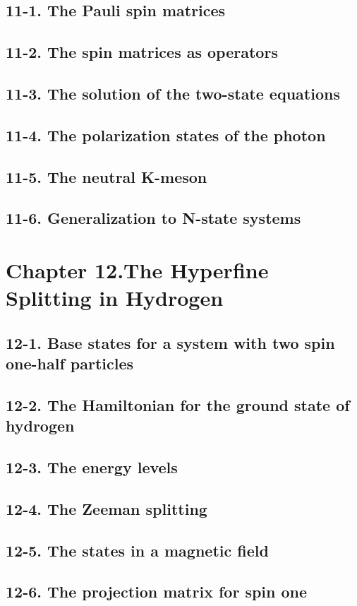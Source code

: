 \documentclass{article}
\begin{document}
\subsection{11-1. The Pauli spin matrices}
\subsection{11-2. The spin matrices as operators}
\subsection{11-3. The solution of the two-state equations}
\subsection{11-4. The polarization states of the photon}
\subsection{11-5. The neutral K-meson}
\subsection{11-6. Generalization to N-state systems}
\section{Chapter 12.The Hyperfine Splitting in Hydrogen}
\subsection{12-1. Base states for a system with two spin one-half particles}
\subsection{12-2. The Hamiltonian for the ground state of hydrogen}
\subsection{12-3. The energy levels}
\subsection{12-4. The Zeeman splitting}
\subsection{12-5. The states in a magnetic field}
\subsection{12-6. The projection matrix for spin one}
\end{document}
